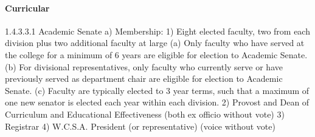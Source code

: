 \documentclass[letterpaper, 11pt]{article}
\begin{document}
			\paragraph{Curricular}

				1.4.3.3.1 Academic Senate
				a) Membership:
				1) Eight elected faculty, two from each division plus two additional faculty at large
				(a) Only faculty who have served at the college for a minimum of 6 years are eligible for election to Academic Senate.
				(b) For divisional representatives, only faculty who currently serve or have previously served as department chair are eligible for election to Academic Senate.
				(c) Faculty are typically elected to 3 year terms, such that a maximum of one new senator is elected each year within each division.
				2) Provost and Dean of Curriculum and Educational Effectiveness (both ex officio without vote)
				3) Registrar
				4) W.C.S.A. President (or representative) (voice without vote)
\end{document}
